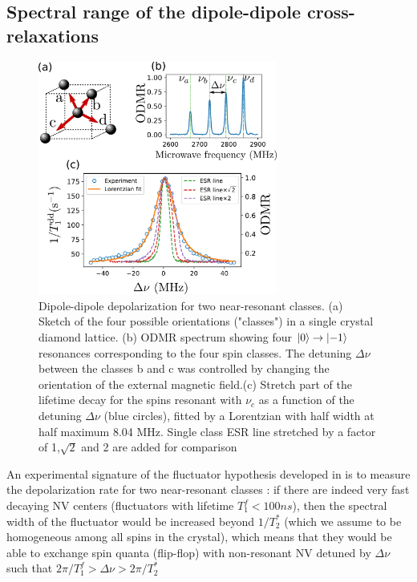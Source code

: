\documentclass[preprintnumbers,amsmath,amssymb,onecolumn,12pt]{revtex4-2}\usepackage{graphicx}%
\begin{document}
\subsection{Spectral range of the dipole-dipole cross-relaxations}
\label{fluctuator width}
\begin{figure}
\includegraphics[width=0.7\textwidth]{Figures_SI/largeur_fluct_SI}
\caption{Dipole-dipole depolarization for two near-resonant classes. (a) Sketch of the four possible orientations ("classes") in a single crystal diamond lattice. (b) ODMR spectrum showing four $\ket{0} \to \ket{-1}$ resonances corresponding to the four spin classes. The detuning $\Delta \nu$ between the classes b and c was controlled by changing the orientation of the external magnetic field.(c) Stretch part of the lifetime decay for the spins resonant with $\nu_c$ as a function of the detuning $\Delta \nu$ (blue circles), fitted by a Lorentzian with half width at half maximum 8.04 MHz. Single class ESR line stretched by a factor of 1,$\sqrt{2}$ and 2 are added for comparison}
\label{largeur_fluct}
\end{figure}

An experimental signature of the fluctuator hypothesis developed in \cite{choi_depolarization_2017} is to measure the depolarization rate for two near-resonant classes : if there are indeed very fast decaying NV centers (fluctuators with lifetime $T_1^f < 100 ns$), then the spectral width of the fluctuator would be increased beyond $1/T_2^*$ (which we assume to be homogeneous among all spins in the crystal), which means that they would be able to exchange spin quanta (flip-flop) with non-resonant NV detuned by $\Delta \nu$ such that $2\pi/T_1^f > \Delta \nu > 2\pi/T_2^*$
\end{document}
